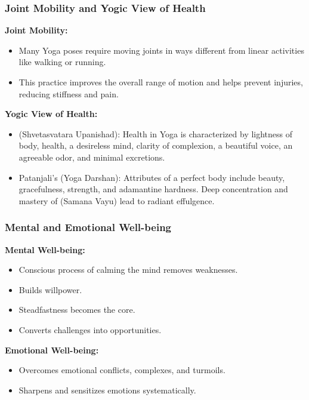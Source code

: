 \begin{frame}[fragile]\frametitle{Joint Mobility and Yogic View of Health}
    \textbf{Joint Mobility:}
    \begin{itemize}
        \item Many Yoga poses require moving joints in ways different from linear activities like walking or running.
        \item This practice improves the overall range of motion and helps prevent injuries, reducing stiffness and pain.
    \end{itemize}

    \vspace{0.5cm}
    \textbf{Yogic View of Health:}
    \begin{itemize}
        \item {} (Shvetasvatara Upanishad): Health in Yoga is characterized by lightness of body, health, a desireless mind, clarity of complexion, a beautiful voice, an agreeable odor, and minimal excretions.
        \item Patanjali’s  (Yoga Darshan): Attributes of a perfect body include beauty, gracefulness, strength, and adamantine hardness. Deep concentration and mastery of  (Samana Vayu) lead to radiant effulgence.
    \end{itemize}
\end{frame}

\begin{frame}[fragile]\frametitle{Mental and Emotional Well-being}
    \textbf{Mental Well-being:}
    \begin{itemize}
        \item Conscious process of calming the mind removes weaknesses.
        \item Builds willpower.
        \item Steadfastness becomes the core.
        \item Converts challenges into opportunities.
    \end{itemize}

    \vspace{0.5cm}
    \textbf{Emotional Well-being:}
    \begin{itemize}
        \item Overcomes emotional conflicts, complexes, and turmoils.
        \item Sharpens and sensitizes emotions systematically.
    \end{itemize}
\end{frame}




